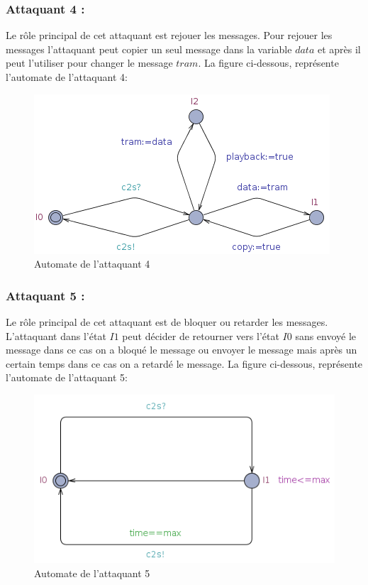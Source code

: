 \documentclass[10pt,a4paper]{article}
\begin{document}
\subsubsection{Attaquant 4 :}
Le rôle principal de cet attaquant est rejouer les messages. Pour rejouer les messages l'attaquant peut copier un seul message dans la variable $data$ et après il peut l'utiliser pour changer le message $tram$. La figure ci-dessous, représente l'automate de l'attaquant 4:  

\begin{figure}[!h]
\centering 
\includegraphics[scale=0.6]{img/attaquant4.png}
\caption{Automate de l'attaquant 4}
\end{figure}

\subsubsection{Attaquant 5 :}
Le rôle principal de cet attaquant est de bloquer ou retarder les messages. L'attaquant dans l'état $I1$ peut décider de retourner vers l'état $I0$ sans envoyé le message dans ce cas on a bloqué le message ou envoyer le message mais après un certain temps dans ce cas on a retardé le message. La figure ci-dessous, représente l'automate de l'attaquant 5:  

\begin{figure}[!h]
\centering 
\includegraphics[scale=0.5]{img/attaquant5.png}
\caption{Automate de l'attaquant 5}
\end{figure}
\end{document}
